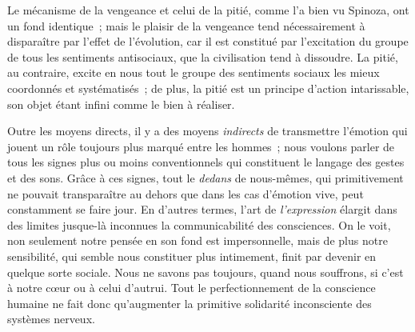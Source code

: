 \documentclass[french,twoside]{book} %
\begin{document}
Le mécanisme de la vengeance et celui de la pitié, comme l’a bien vu Spinoza, ont un fond identique ; mais le plaisir de la vengeance tend nécessairement à disparaître par l’effet de l’évolution, car il est constitué par l’excitation du groupe de tous les sentiments antisociaux, que la civilisation tend à dissoudre. La pitié, au contraire, excite en nous tout le groupe des sentiments sociaux les mieux coordonnés et systématisés ; de plus, la pitié est un principe d’action intarissable, son objet étant infini comme le bien à réaliser.\par
Outre les moyens directs, il y a des moyens \emph{indirects} de transmettre l’émotion qui jouent un rôle toujours plus marqué entre les hommes ; nous voulons parler de tous les signes plus ou moins conventionnels qui constituent le langage des gestes et des sons. Grâce à ces signes, tout le \emph{dedans} de nous-mêmes, qui primitivement ne pouvait transparaître au dehors que dans les cas d’émotion vive, peut constamment se faire jour. En d’autres termes, l’art de \emph{l’expression} élargit dans des limites jusque-là inconnues la communicabilité des consciences. On le voit, non seulement notre pensée en son fond est impersonnelle, mais de plus notre sensibilité, qui semble nous constituer plus intimement, finit par devenir en quelque sorte sociale. Nous ne savons pas toujours, quand nous souffrons, si c’est à notre cœur ou à celui d’autrui. Tout le perfectionnement de la conscience humaine ne fait donc qu’augmenter la primitive solidarité inconsciente des systèmes nerveux.
\end{document}
